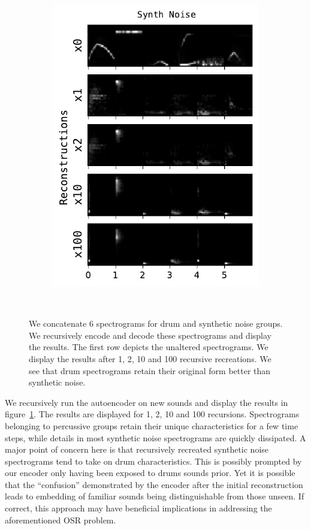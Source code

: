 \documentclass[\main/thesis.tex]{subfiles}
\begin{document}
\begin{figure}[h!]
{\begin{subfigure}[b]{.6\textwidth}
\includegraphics[width=.95\textwidth]{images/chapter_3/Synth Noise_reacreation.pdf}
\end{subfigure}%
}\\
\caption{We concatenate 6 spectrograms for drum and synthetic noise groups. We recursively encode and decode these spectrograms and display the results. The first row depicts the unaltered spectrograms. We display the results after 1, 2, 10 and 100 recursive recreations. We see that drum spectrograms retain their original form better than synthetic noise.}
\label{fig:recreations}
\end{figure}

We recursively run the autoencoder on new sounds and display the results in figure~\ref{fig:recreations}. The results are displayed for 1, 2, 10 and 100 recursions. Spectrograms belonging to percussive groups retain their unique characteristics for a few time steps, while details in most synthetic noise spectrograms are quickly dissipated. A major point of concern here is that recursively recreated synthetic noise spectrograms tend to take on drum characteristics. This is possibly prompted by our encoder only having been exposed to drums sounds prior.  Yet it is possible that the \enquote{confusion} demonstrated by the encoder after the initial reconstruction leads to embedding of familiar sounds being distinguishable from those unseen. If correct, this approach may have beneficial implications in addressing the aforementioned OSR problem.  
\end{document}
